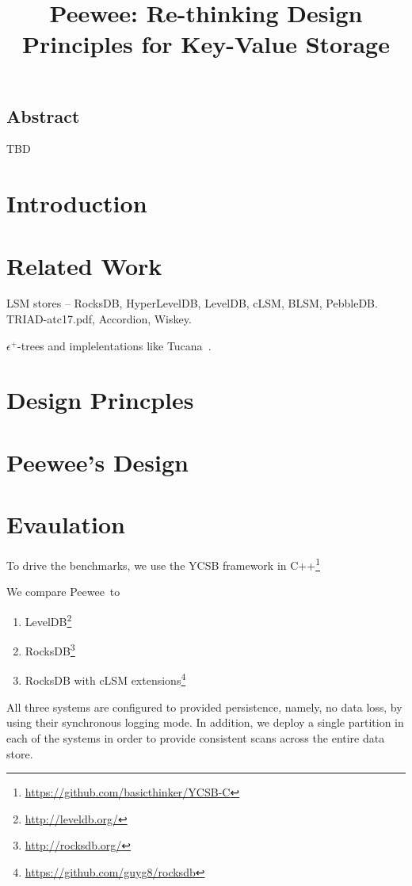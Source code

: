 \documentclass[letterpaper,twocolumn,10pt]{article}
\date{}
\newcommand{\sys}{Peewee}
\begin{document}
\title{\Large \bf \sys: Re-thinking Design Principles for Key-Value Storage} 
\author{}
\maketitle

\subsection*{Abstract}

TBD


\section{Introduction}


\section{Related Work}
\label{sec:related}

LSM stores -- RocksDB, HyperLevelDB, LevelDB, cLSM, BLSM, PebbleDB.
TRIAD-atc17.pdf, 
Accordion, 
Wiskey.

$\epsilon^+$-trees and implelentations like Tucana~\cite{tucana}.


\section{Design Princples}
\label{sec:principles}


\section{\sys's Design}
\label{sec:design}



\section{Evaulation}
\label{sec:eval}

To drive the benchmarks, we use the 
YCSB framework in C++\footnote{\url{https://github.com/basicthinker/YCSB-C}}  

We compare \sys\ to 
\begin{enumerate}
\item
LevelDB\footnote{\url{http://leveldb.org/}}
\item
RocksDB\footnote{\url{http://rocksdb.org/}}
\item
RocksDB with cLSM extensions\footnote{\url{https://github.com/guyg8/rocksdb}}
\end{enumerate}
All three systems are configured to provided persistence, namely, no data loss, by using their synchronous logging mode.
In addition, we deploy a single partition in each of the systems in order to provide consistent scans across the entire data store.
\end{document}
